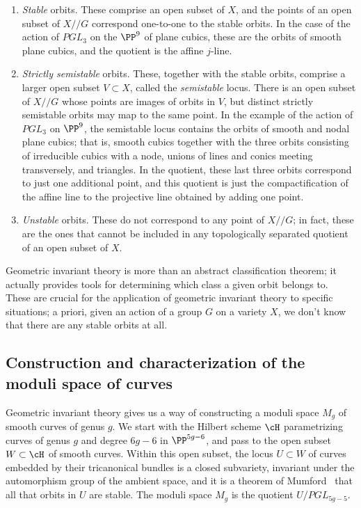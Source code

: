 \begin{enumerate}

\item  \emph{Stable} orbits. These comprise an open subset of $X$, and the points of an open subset of $X//G$ correspond one-to-one to the stable orbits. In the case of the action of $PGL_3$ on the $\PP^9$ of plane cubics, these are the orbits of smooth plane cubics, and the quotient is the affine $j$-line.

\item \emph{Strictly semistable} orbits. These, together with the stable orbits, comprise a larger open subset $V \subset X$, called the \emph{semistable} locus. There is an open subset of
$X//G$ whose points are images of orbits in $V$, but distinct strictly semistable orbits may map to the same point. In the example of the action of $PGL_3$ on  $\PP^9$, the semistable  locus contains  the orbits of smooth and nodal plane cubics; that is, smooth cubics together with the three orbits consisting of irreducible cubics with a node, unions of lines and conics meeting transversely, and triangles. In the quotient, these last three orbits correspond to just one additional point, and this quotient is just the compactification of the affine line to the projective line obtained by adding one point.

\item  \emph{Unstable} orbits. These do not correspond to any point of $X//G$; in fact, these are the ones that cannot be included in any topologically separated quotient of an open subset of $X$.

\end{enumerate}

Geometric invariant theory is more than an abstract classification theorem; it actually provides tools for determining which class a given orbit belongs to. These are crucial for the application of geometric invariant theory to specific situations; a  priori, given an action of a group $G$ on a variety $X$, we don't know that there are any stable orbits at all.

\subsection{Construction and characterization of the moduli space of curves}

Geometric invariant theory gives us a way of constructing a moduli space $M_g$ of smooth  curves of genus $g$. We start with the Hilbert scheme $\cH$ parametrizing curves of genus $g$ and degree $6g-6$ in $\PP^{5g-6}$, and pass to the open subset $W \subset \cH$ of smooth curves. Within this open subset, the locus $U \subset W$ of curves embedded by their tricanonical bundles is a closed subvariety, invariant under the automorphism group of the ambient space, and it is a theorem of Mumford~\cite{GIT} that all that orbits in $U$ are stable. The moduli space $M_g$ is the quotient $U/PGL_{5g-5}$.

